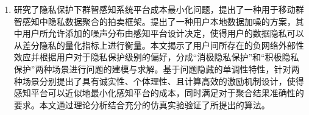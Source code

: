 \begin{enumerate}
     \item 研究了隐私保护下群智感知系统平台成本最小化问题，提出了一种用于移动群智感知中隐私数据聚合的拍卖框架。提出了一种用户本地数据加噪的方案，其中用户所允许添加的噪声分布由感知平台设计决定，使得用户的数据隐私可以从差分隐私的量化指标上进行衡量。本文揭示了用户间所存在的负网络外部性效应并根据用户对于隐私保护级别的偏好，分成“消极隐私保护”和“积极隐私保护”两种场景进行问题的建模与求解。基于问题隐藏的单调性特性，针对两种场景分别提出了具有诚实性、个体理性、且计算高效的激励机制设计，使得感知平台可以近似地最小化感知平台的成本，同时满足对于聚合结果准确性的要求。本文通过理论分析结合充分的仿真实验验证了所提出的算法。


\end{enumerate}
